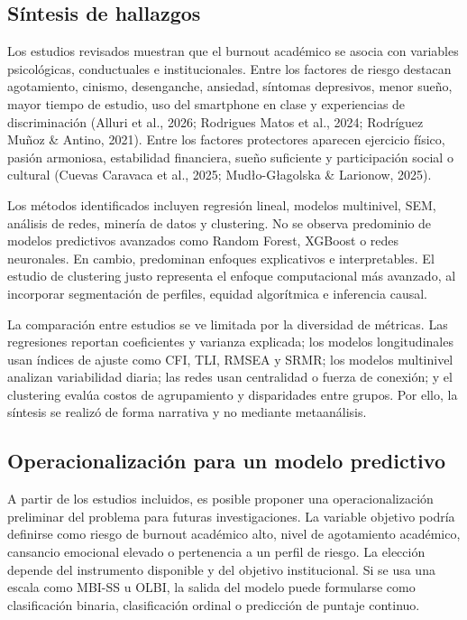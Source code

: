 \documentclass[12pt,a4paper]{article}
\begin{document}
\subsection{Síntesis de hallazgos}

Los estudios revisados muestran que el burnout académico se asocia con variables psicológicas, conductuales e institucionales. Entre los factores de riesgo destacan agotamiento, cinismo, desenganche, ansiedad, síntomas depresivos, menor sueño, mayor tiempo de estudio, uso del smartphone en clase y experiencias de discriminación (Alluri et al., 2026; Rodrigues Matos et al., 2024; Rodríguez Muñoz \& Antino, 2021). Entre los factores protectores aparecen ejercicio físico, pasión armoniosa, estabilidad financiera, sueño suficiente y participación social o cultural (Cuevas Caravaca et al., 2025; Mud\l{}o-G\l{}agolska \& Larionow, 2025).

Los métodos identificados incluyen regresión lineal, modelos multinivel, SEM, análisis de redes, minería de datos y clustering. No se observa predominio de modelos predictivos avanzados como Random Forest, XGBoost o redes neuronales. En cambio, predominan enfoques explicativos e interpretables. El estudio de clustering justo representa el enfoque computacional más avanzado, al incorporar segmentación de perfiles, equidad algorítmica e inferencia causal.

La comparación entre estudios se ve limitada por la diversidad de métricas. Las regresiones reportan coeficientes y varianza explicada; los modelos longitudinales usan índices de ajuste como CFI, TLI, RMSEA y SRMR; los modelos multinivel analizan variabilidad diaria; las redes usan centralidad o fuerza de conexión; y el clustering evalúa costos de agrupamiento y disparidades entre grupos. Por ello, la síntesis se realizó de forma narrativa y no mediante metaanálisis.


\subsection{Operacionalización para un modelo predictivo}

A partir de los estudios incluidos, es posible proponer una operacionalización preliminar del problema para futuras investigaciones. La variable objetivo podría definirse como riesgo de burnout académico alto, nivel de agotamiento académico, cansancio emocional elevado o pertenencia a un perfil de riesgo. La elección depende del instrumento disponible y del objetivo institucional. Si se usa una escala como MBI-SS u OLBI, la salida del modelo puede formularse como clasificación binaria, clasificación ordinal o predicción de puntaje continuo.
\end{document}
